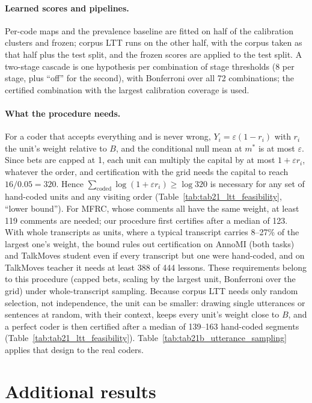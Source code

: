 \paragraph{Learned scores and pipelines.} Per-code maps and the prevalence baseline are fitted on half of the calibration
clusters and frozen; corpus LTT runs on the other half, with the corpus taken as that half plus the test split, and the frozen
scores are applied to the test split. A two-stage cascade is one hypothesis per combination of stage thresholds (8 per stage,
plus ``off'' for the second), with Bonferroni over all 72 combinations; the certified combination with the largest calibration
coverage is used.

\paragraph{What the procedure needs.} For a coder that accepts everything and is never wrong, $Y_i=\varepsilon(1-r_i)$ with
$r_i$ the unit's weight relative to $B$, and the conditional null mean at $m^\ast$ is at most $\varepsilon$. Since bets are capped at
1, each unit can multiply the capital by at most $1+\varepsilon r_i$, whatever the order, and certification with the grid needs
the capital to reach $16/0.05=320$. Hence $\sum_{\text{coded}}\log(1+\varepsilon r_i)\ge\log 320$ is necessary for any set of
hand-coded units and any visiting order (Table~\ref{tab:tab21_ltt_feasibility}, ``lower bound''). For MFRC, whose comments
all have the same weight, at least 119 comments are needed; our procedure first certifies after a median of 123. With whole
transcripts as units, where a typical transcript carries 8--27\% of the largest one's weight, the bound rules out
certification on AnnoMI (both tasks) and TalkMoves student even if every transcript but one were hand-coded, and on
TalkMoves teacher it needs at least 388 of 444 lessons. These requirements belong to this procedure (capped bets, scaling by
the largest unit, Bonferroni over the grid) under whole-transcript sampling. Because corpus LTT needs only random selection,
not independence, the unit can be smaller: drawing single utterances or sentences at random, with their context, keeps every
unit's weight close to $B$, and a perfect coder is then certified after a median of 139--163 hand-coded segments
(Table~\ref{tab:tab21_ltt_feasibility}). Table~\ref{tab:tab21b_utterance_sampling} applies that design to the real coders.

\section{Additional results}
\label{app:results}

